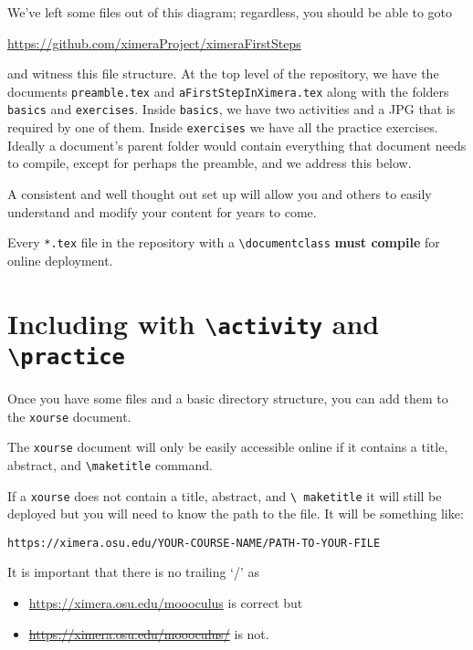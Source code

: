 \documentclass{ximera}
\begin{document}
We've left some files out of this diagram; regardless, you should be able to
goto
\begin{center}
  \url{https://github.com/ximeraProject/ximeraFirstSteps}
\end{center}
and witness this file structure. At the top level of the repository, we have
the documents \verb!preamble.tex! and \verb!aFirstStepInXimera.tex! along with
the folders \verb!basics! and \verb!exercises!. Inside \verb!basics!, we have
two activities and a JPG that is required by one of them. Inside
\verb!exercises!
we have all the practice exercises.
Ideally a document's parent folder would contain everything that document needs
to compile, except for perhaps the preamble, and we address this below.

A consistent and well thought out set up will allow you and others to easily
understand and modify your
content for years to come.

\begin{warning}
  Every \verb!*.tex! file in the repository with a \verb!\documentclass!
  \textbf{must compile} for online deployment.
\end{warning}

\section{Including with \texttt{\textbackslash activity} and
  \texttt{\textbackslash practice}}

Once you have some files and a basic directory structure, you can add them to
the \verb!xourse! document.

\begin{warning}
  The \verb!xourse! document will only be easily accessible online if it
  contains a title,
  abstract, and {\tt\textbackslash maketitle} command.

  If a \verb!xourse! does not contain a title, abstract, and {\tt\textbackslash
      maketitle} it will still be deployed but you will need to know the path
  to the
  file. It will be something like:
  \begin{center}
    \tt https://ximera.osu.edu/YOUR-COURSE-NAME/PATH-TO-YOUR-FILE
  \end{center}
  It is important that there is no trailing `/' as
  \begin{itemize}
    \item \url{https://ximera.osu.edu/moooculus} is correct but
    \item \sout{\url{https://ximera.osu.edu/moooculus/}} is not.
  \end{itemize}
\end{warning}
\end{document}
